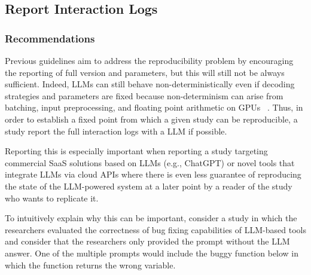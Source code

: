 



\subsection{Report Interaction Logs}

\subsubsection{Recommendations}


Previous guidelines aim to address the reproducibility problem by encouraging the reporting of full version and parameters, but this will still not be always sufficient. Indeed, LLMs can still behave non-deterministically even if decoding strategies and parameters are fixed because non-determinism can arise from batching, input preprocessing, and floating point arithmetic on GPUs ~\cite{Chann2023}. Thus, in order to establish a fixed point from which a given study can be reproducible, a study \should report the full interaction logs with a LLM if possible. 


Reporting this is especially important when reporting a study targeting commercial SaaS solutions based on LLMs (e.g., ChatGPT) or novel tools that integrate LLMs via cloud APIs where there is even less guarantee of reproducing the state of the LLM-powered system at a later point by a reader of the study who wants to replicate it. 

To intuitively explain why this can be important, consider a study in which the researchers evaluated the correctness of bug fixing capabilities of LLM-based tools and consider that the researchers only provided the prompt without the LLM answer. One of the multiple prompts would include the buggy function below in which the function returns the wrong variable. 

